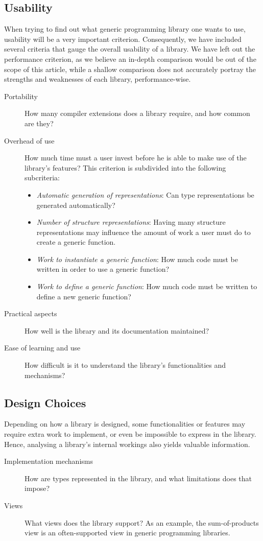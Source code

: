 \documentclass[twocolumn,11pt,a4paper]{article}
\begin{document}
\subsection{Usability}

When trying to find out what generic programming library one wants to use, usability will be a very important criterion. Consequently, we have included several criteria that gauge the overall usability of a library. We have left out the performance criterion, as we believe an in-depth comparison would be out of the scope of this article, while a shallow comparison does not accurately portray the strengths and weaknesses of each library, performance-wise.
\begin{description}
\item[Portability] 
How many compiler extensions does a library require, and how common are they?
\item[Overhead of use] 
How much time must a user invest before he is able to make use of the library's features? This criterion is subdivided into the following subcriteria:
\begin{itemize}
\item \textit{Automatic generation of representations}: Can type representations be generated automatically?
\item \textit{Number of structure representations}: Having many structure representations may influence the amount of work a user must do to create a generic function.
\item \textit{Work to instantiate a generic function}: How much code must be written in order to use a generic function?
\item \textit{Work to define a generic function}: How much code must be written to define a new generic function?
\end{itemize}
\item[Practical aspects] 
How well is the library and its documentation maintained?
\item[Ease of learning and use] 
How difficult is it to understand the library's functionalities and mechanisms?
\end{description}

\subsection{Design Choices}

Depending on how a library is designed, some functionalities or features may require extra work to implement, or even be impossible to express in the library.
Hence, analysing a library's internal workings also yields valuable information.
\begin{description}
\item[Implementation mechanisms] 
How are types represented in the library, and what limitations does that impose?
\item[Views] 
What views does the library support? 
As an example, the sum-of-products view is an often-supported view in generic programming libraries.
\end{description}
\end{document}
